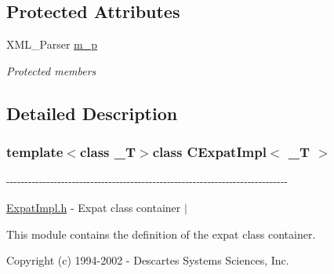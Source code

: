 \subsection*{\-Protected \-Attributes}
\begin{DoxyCompactItemize}
\item 
\-X\-M\-L\-\_\-\-Parser \hyperlink{class_c_expat_impl_a75803f8a4d4dc098f243dabbfba5de77}{m\-\_\-p}
\begin{DoxyCompactList}\small\item\em \-Protected members \end{DoxyCompactList}\end{DoxyCompactItemize}


\subsection{\-Detailed \-Description}
\subsubsection*{template$<$class \-\_\-\-T$>$class C\-Expat\-Impl$<$ \-\_\-\-T $>$}

-\/-\/-\/-\/-\/-\/-\/-\/-\/-\/-\/-\/-\/-\/-\/-\/-\/-\/-\/-\/-\/-\/-\/-\/-\/-\/-\/-\/-\/-\/-\/-\/-\/-\/-\/-\/-\/-\/-\/-\/-\/-\/-\/-\/-\/-\/-\/-\/-\/-\/-\/-\/-\/-\/-\/-\/-\/-\/-\/-\/-\/-\/-\/-\/-\/-\/-\/-\/-\/-\/-\/-\/-\/-\/-\/-\/-\/

\hyperlink{_expat_impl_8h}{\-Expat\-Impl.\-h} -\/ \-Expat class container $|$

\-This module contains the definition of the expat class container.

\-Copyright (c) 1994-\/2002 -\/ \-Descartes \-Systems \-Sciences, \-Inc.


